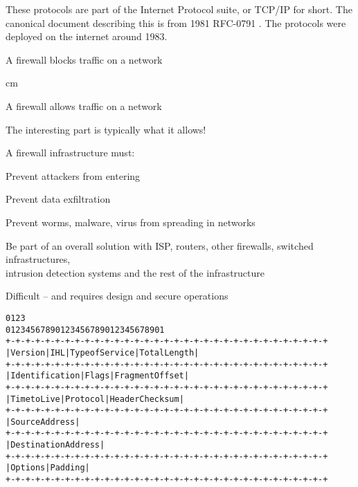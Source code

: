 \documentclass[Screen16to9,17pt]{foils}
\begin{document}
These protocols are part of the Internet Protocol suite, or TCP/IP for short. The canonical document describing this is from 1981 RFC-0791 . The protocols were deployed on the internet around 1983.







\centerline{\hlkbig A firewall {\color{security6blue}blocks traffic} on a network}

 cm
\pause

\centerline{\hlkbig A firewall {\color{red}allows traffic} on a network}
{\small The interesting part is typically what it allows!}

\begin{list1}
\item A firewall infrastructure must:
\begin{list2}
\item Prevent attackers from entering
\item Prevent data exfiltration
\item Prevent worms, malware, virus from spreading in networks
\item Be part of an overall solution with ISP, routers, other firewalls, switched infrastructures,\\
  intrusion detection systems and the rest of the infrastructure
\end{list2}
\end{list1}

\vskip 5mm
\centerline{Difficult -- and requires design and secure operations}



\begin{alltt}\footnotesize
0                   1                   2                   3
0 1 2 3 4 5 6 7 8 9 0 1 2 3 4 5 6 7 8 9 0 1 2 3 4 5 6 7 8 9 0 1
+-+-+-+-+-+-+-+-+-+-+-+-+-+-+-+-+-+-+-+-+-+-+-+-+-+-+-+-+-+-+-+-+
|Version|  IHL  |Type of Service|          Total Length         |
+-+-+-+-+-+-+-+-+-+-+-+-+-+-+-+-+-+-+-+-+-+-+-+-+-+-+-+-+-+-+-+-+
|         Identification        |Flags|      Fragment Offset    |
+-+-+-+-+-+-+-+-+-+-+-+-+-+-+-+-+-+-+-+-+-+-+-+-+-+-+-+-+-+-+-+-+
|  Time to Live |    Protocol   |         Header Checksum       |
+-+-+-+-+-+-+-+-+-+-+-+-+-+-+-+-+-+-+-+-+-+-+-+-+-+-+-+-+-+-+-+-+
|                       Source Address                          |
+-+-+-+-+-+-+-+-+-+-+-+-+-+-+-+-+-+-+-+-+-+-+-+-+-+-+-+-+-+-+-+-+
|                    Destination Address                        |
+-+-+-+-+-+-+-+-+-+-+-+-+-+-+-+-+-+-+-+-+-+-+-+-+-+-+-+-+-+-+-+-+
|                    Options                    |    Padding    |
+-+-+-+-+-+-+-+-+-+-+-+-+-+-+-+-+-+-+-+-+-+-+-+-+-+-+-+-+-+-+-+-+
\end{alltt}
\end{document}
